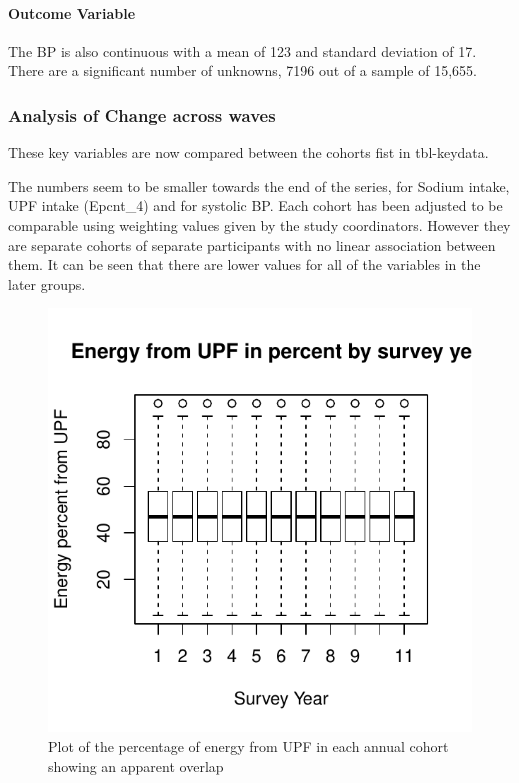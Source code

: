 \documentclass[
]{article}
\begin{document}
\hypertarget{outcome-variable}{%
\paragraph{Outcome Variable}\label{outcome-variable}}

The BP is also continuous with a mean of 123 and standard deviation of
17. There are a significant number of unknowns, 7196 out of a sample of
15,655.

\hypertarget{analysis-of-change-across-waves}{%
\subsubsection{Analysis of Change across
waves}\label{analysis-of-change-across-waves}}

These key variables are now compared between the cohorts fist in
tbl-keydata.

The numbers seem to be smaller towards the end of the series, for Sodium
intake, UPF intake (Epcnt\_4) and for systolic BP. Each cohort has been
adjusted to be comparable using weighting values given by the study
coordinators. However they are separate cohorts of separate participants
with no linear association between them. It can be seen that there are
lower values for all of the variables in the later groups.

\begin{figure}
\centering
\includegraphics{nextlevel_files/figure-latex/fig-upf-and-survey-year-1.pdf}
\caption{Plot of the percentage of energy from UPF in each annual cohort
showing an apparent overlap}
\end{figure}
\end{document}
